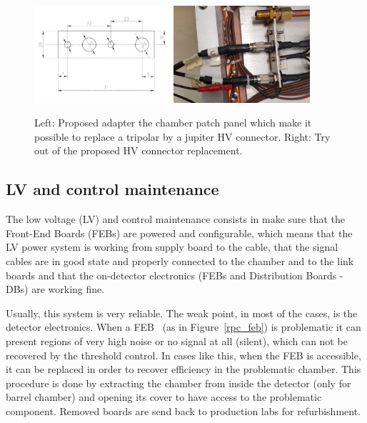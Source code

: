 \begin{figure}[!htbp]
\begin{center}
\includegraphics[width=0.45\textwidth,keepaspectratio]{figures/rpc/endcap_hv_pp.pdf}\hspace*{1.cm}
\includegraphics[width=0.45\textwidth,keepaspectratio]{figures/rpc/endcap_hv_pp_tryout.jpg}\hspace*{1.cm}
\end{center}\vspace*{-.5cm}
\caption{Left: Proposed adapter the chamber patch panel which make it possible to replace a tripolar by a jupiter HV connector. Right: Try out of the proposed HV connector replacement.}
\label{jupiterized}
\end{figure}

\subsection{LV and control maintenance}

The low voltage (LV) and control maintenance consists in make sure that the Front-End Boards (FEBs) are powered and configurable, which means that the LV power system is working from supply board to the cable, that the signal cables are in good state and properly connected to the chamber and to the link boards and that the on-detector electronics (FEBs and Distribution Boards - DBs) are working fine.

Usually, this system is very reliable. The weak point, in most of the cases, is the detector electronics. When a FEB~\cite{rpc_feb} (as in Figure~\ref{rpc_feb}) is problematic it can present regions of very high noise or no signal at all (silent), which can not be recovered by the threshold control. In cases like this, when the FEB is accessible, it can be replaced in order to recover efficiency in the problematic chamber. This procedure is done by extracting the chamber from inside the detector (only for barrel chamber) and opening its cover to have access to the problematic component. Removed boards are send back to production labs for refurbishment.

